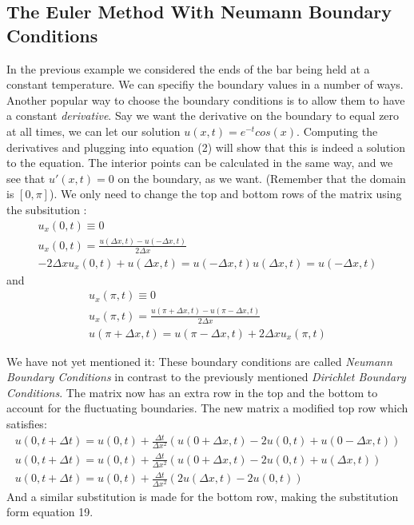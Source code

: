 \documentclass[a4paper]{article}
\begin{document}
\subsection{The Euler Method With Neumann Boundary Conditions}
In the previous example we considered the ends of the bar being held at a constant temperature. We can specifiy the boundary values in a number of ways. Another popular way to choose the boundary conditions is to allow them to have a constant \emph{derivative}. Say we want the derivative on the boundary to equal zero at all times, we can let our solution $u(x, t) = e^{-t}cos(x)$. Computing the derivatives and plugging into equation (2) will show that this is indeed a solution to the equation. The interior points can be calculated in the same way, and we see that $u'(x,t) = 0$
on the boundary, as we want. (Remember that the domain is $[0, \pi]$).
We only need to change the top and bottom rows of the matrix using the subsitution :
\begin{gather}
u_x(0, t) \equiv 0\\
u_x(0, t) = \frac{u(\Delta x, t) - u(-\Delta x, t)}{2\Delta x}\\
-2\Delta x u_x(0,t) + u(\Delta x, t) = u(-\Delta x, t)
u(\Delta x, t) = u(-\Delta x, t)
\end{gather}
and
\begin{gather}
u_x(\pi, t) \equiv 0\\
u_x(\pi, t) = \frac{u(\pi + \Delta x, t) - u(\pi - \Delta x, t)}{2 \Delta x}\\
u(\pi + \Delta x, t) = u(\pi - \Delta x, t) + 2\Delta x u_x(\pi, t)
\end{gather}

We have not yet mentioned it: These boundary conditions are called \emph{Neumann Boundary Conditions} in contrast to the previously mentioned \emph{Dirichlet Boundary Conditions}.
The matrix now has an extra row in the top and the bottom to account for the fluctuating boundaries. The new matrix a modified top row which satisfies:
\begin{gather}
u(0, t + \Delta t) = u(0, t) + \frac{\Delta t}{\Delta x ^2}(u(0 + \Delta x, t) - 2u(0, t) + u(0 - \Delta x, t))\\
u(0, t + \Delta t) = u(0, t) + \frac{\Delta t}{\Delta x ^2}(u(0 + \Delta x, t) - 2u(0, t) + u(\Delta x, t))\\
u(0, t + \Delta t) = u(0, t) + \frac{\Delta t}{\Delta x ^2}(2u(\Delta x, t) - 2u(0, t))
\end{gather}
And a similar substitution is made for the bottom row, making the substitution form equation 19.
\end{document}
